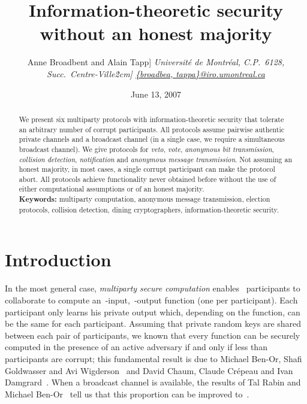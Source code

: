 \documentclass[11pt]{article}
\begin{document}
\title{Information-theoretic security \\ without an honest
majority\\} \vspace{15pt}
\author{Anne Broadbent  and   Alain Tapp\-0.1cm]
\normalsize\sl Universit\'e de Montr\'eal, C.P.~6128, Succ.\ Centre-Ville\.2cm]
\url{{broadbea, tappa}@iro.umontreal.ca} }

\date{June 13, 2007}


\maketitle

\begin{abstract}We present six multiparty protocols with
information-theoretic security that tolerate an arbitrary number of
corrupt participants. All protocols assume pairwise authentic
private channels and a broadcast channel (in a single case, we
require a simultaneous broadcast channel). We give protocols for
\emph{veto},  \emph{vote}, \emph{anonymous bit transmission},
\emph{collision detection}, \emph{notification} and \emph{anonymous
message transmission}. Not assuming an honest majority, in most
cases, a single corrupt participant can make the protocol abort. All
protocols achieve functionality never obtained before without the
use of either computational assumptions or of an honest majority.
\\
\textbf{Keywords:} multiparty computation, anonymous message
transmission, election protocols, collision detection, dining
cryptographers, information-theoretic security.\end{abstract}





\section{Introduction}

In the most general case, \emph{multiparty secure computation}
enables~ participants to collaborate to compute
an~-input,~-output function (one per participant). Each
participant only learns his private output which, depending on the
function, can be the same for each participant. Assuming that
private random keys are shared between each pair of participants, we
known that every  function can be securely computed in the presence
of an active adversary if and only if less than~ participants
are corrupt; this fundamental result is due to Michael Ben-Or, Shafi
Goldwasser and Avi Wigderson~\cite{BGW88} and David Chaum, Claude
Cr\'epeau and Ivan Damg\a rard~\cite{CCD88}. When a  broadcast
channel is available, the results of Tal Rabin and Michael
\mbox{Ben-Or}~\cite{RB89} tell us that this proportion can be
improved to~.
\end{document}
